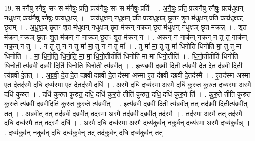 \documentclass[17pt]{extarticle}
\begin{document}
19. स म॑नैषु रनैषुः॒ सꣳ स म॑नैषुः॒ प्रति॒ प्रत्य॑नैषुः॒ सꣳ स म॑नैषुः॒ प्रति॑ । . अ॒नै॒षुः॒ प्रति॒ प्रत्य॑नैषु रनैषुः॒ प्रत्य॑धुक्षन् नधुक्ष॒न् प्रत्य॑नैषु रनैषुः॒ प्रत्य॑धुक्षन्न् । . प्रत्य॑धुक्षन् नधुक्ष॒न् प्रति॒ प्रत्य॑धुक्षञ् छृ॒तꣳ शृ॒त म॑धुक्ष॒न् प्रति॒ प्रत्य॑धुक्षञ् छृ॒तम् । . अ॒धु॒क्ष॒ञ् छृ॒तꣳ शृ॒त म॑धुक्षन् नधुक्षञ् छृ॒त म॑क्रन् नक्रञ् छृ॒त म॑धुक्षन् नधुक्षञ् छृ॒त म॑क्रन्न् । . शृ॒त म॑क्रन् नक्रञ् छृ॒तꣳ शृ॒त म॑क्र॒न् न नाक्र॑ञ् छृ॒तꣳ शृ॒त म॑क्र॒न् न । . अ॒क्र॒न् न नाक्र॑न् नक्र॒न् न तु तु नाक्र॑न् नक्र॒न् न तु । . न तु तु न न तु मा॑ मा॒ तु न न तु मा᳚ । . तु मा॑ मा॒ तु तु मा॑ धिनोति धिनोति मा॒ तु तु मा॑ धिनोति । . मा॒ धि॒नो॒ति॒ धि॒नो॒ति॒ मा॒ मा॒ धि॒नो॒तीतीति॑ धिनोति मा मा धिनो॒तीति॑ । . धि॒नो॒तीतीति॑ धिनोति धिनो॒ती त्य॑ब्रवी दब्रवी॒ दिति॑ धिनोति धिनो॒ती त्य॑ब्रवीत् । . इत्य॑ब्रवी दब्रवी॒ दिती त्य॑ब्रवी दे॒त दे॒त द॑ब्रवी॒ दिती त्य॑ब्रवी दे॒तत् । . अ॒ब्र॒वी॒ दे॒त दे॒त द॑ब्रवी दब्रवी दे॒त द॑स्मा अस्मा ए॒त द॑ब्रवी दब्रवी दे॒तद॑स्मै । . ए॒तद॑स्मा अस्मा ए॒त दे॒तद॑स्मै॒ दधि॒ दध्य॑स्मा ए॒त दे॒तद॑स्मै॒ दधि॑ । . अ॒स्मै॒ दधि॒ दध्य॑स्मा अस्मै॒ दधि॑ कुरुत कुरुत॒ दध्य॑स्मा अस्मै॒ दधि॑ कुरुत । . दधि॑ कुरुत कुरुत॒ दधि॒ दधि॑ कुरु॒ते तीति॑ कुरुत॒ दधि॒ दधि॑ कुरु॒ते ति॑ । . कु॒रु॒ते तीति॑ कुरुत कुरु॒ते त्य॑ब्रवी दब्रवी॒दिति॑ कुरुत कुरु॒ते त्य॑ब्रवीत् । . इत्य॑ब्रवी दब्रवी॒ दिती त्य॑ब्रवी॒त् तत् तद॑ब्रवी॒ दितीत्य॑ब्रवी॒त् तत् । . अ॒ब्र॒वी॒त् तत् तद॑ब्रवी दब्रवी॒त् तद॑स्मा अस्मै॒ तद॑ब्रवी दब्रवी॒त् तद॑स्मै । . तद॑स्मा अस्मै॒ तत् तद॑स्मै॒ दधि॒ दध्य॑स्मै॒ तत् तद॑स्मै॒ दधि॑ । . अ॒स्मै॒ दधि॒ दध्य॑स्मा अस्मै॒ दध्य॑कुर्वन् नकुर्व॒न् दध्य॑स्मा अस्मै॒ दध्य॑कुर्वन्न् । . दध्य॑कुर्वन् नकुर्व॒न् दधि॒ दध्य॑कुर्व॒न् तत् तद॑कुर्व॒न् दधि॒ दध्य॑कुर्व॒न् तत् । \newline
\end{document}
